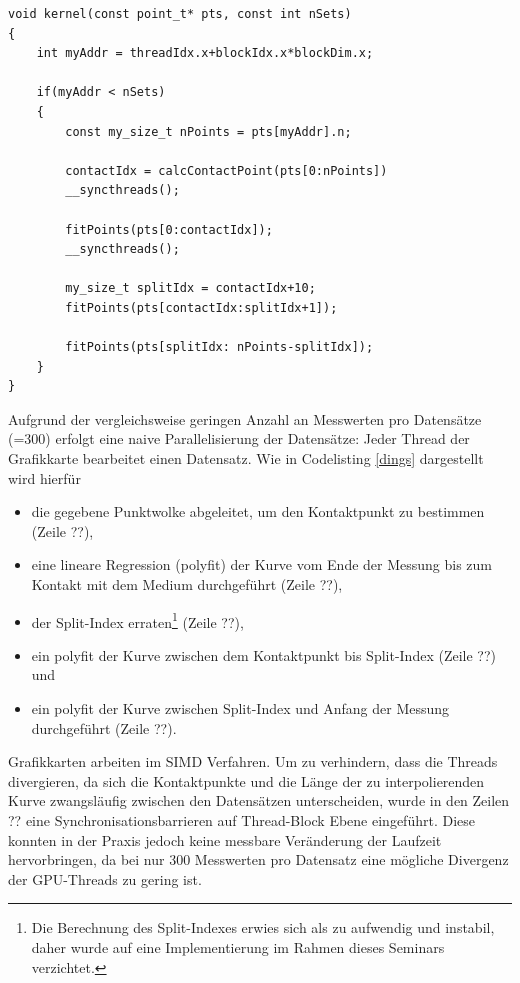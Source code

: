\begin{lstlisting}
void kernel(const point_t* pts, const int nSets)
{
    int myAddr = threadIdx.x+blockIdx.x*blockDim.x;

    if(myAddr < nSets)
    {
        const my_size_t nPoints = pts[myAddr].n;

        contactIdx = calcContactPoint(pts[0:nPoints])
        __syncthreads();

        fitPoints(pts[0:contactIdx]);
        __syncthreads();
                
        my_size_t splitIdx = contactIdx+10;
        fitPoints(pts[contactIdx:splitIdx+1]);

        fitPoints(pts[splitIdx: nPoints-splitIdx]);
    }
}
\end{lstlisting}


Aufgrund der vergleichsweise geringen Anzahl an Messwerten pro Datensätze (=300) erfolgt eine naive Parallelisierung der Datensätze: Jeder Thread der Grafikkarte bearbeitet einen Datensatz. Wie in Codelisting \ref{dings} dargestellt wird hierfür

\begin{itemize}
\item die gegebene Punktwolke abgeleitet, um den Kontaktpunkt zu bestimmen (Zeile ??),
\item eine lineare Regression (polyfit) der Kurve vom Ende der Messung bis zum Kontakt mit dem Medium durchgeführt (Zeile ??),
\item der Split-Index erraten\footnote{Die Berechnung des Split-Indexes erwies sich als zu aufwendig und instabil, daher wurde auf eine Implementierung im Rahmen dieses Seminars verzichtet.} (Zeile ??),
\item ein polyfit der Kurve zwischen dem Kontaktpunkt bis Split-Index  (Zeile ??) und
\item ein polyfit der Kurve zwischen Split-Index und Anfang der Messung durchgeführt  (Zeile ??).
\end{itemize}

Grafikkarten arbeiten im SIMD Verfahren. Um zu verhindern, dass die Threads divergieren, da sich die Kontaktpunkte und die Länge der zu interpolierenden Kurve zwangsläufig zwischen den Datensätzen unterscheiden, wurde in den Zeilen ?? eine Synchronisationsbarrieren auf Thread-Block Ebene eingeführt.
Diese konnten in der Praxis jedoch keine messbare Veränderung der Laufzeit hervorbringen, da bei nur 300 Messwerten pro Datensatz eine mögliche Divergenz der GPU-Threads zu gering ist.

